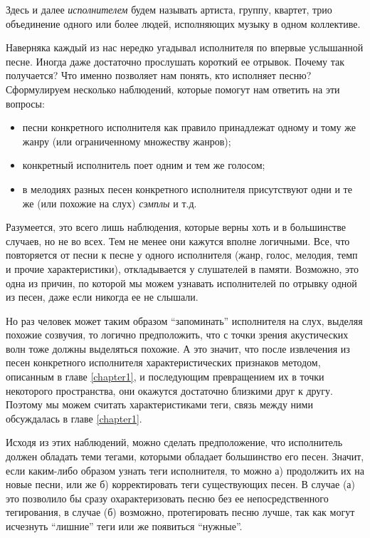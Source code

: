 Здесь и далее \emph{исполнителем} будем называть артиста, группу, квартет, трио \ld объединение одного или более людей, исполняющих музыку в одном коллективе.

Наверняка каждый из нас нередко угадывал исполнителя по впервые услышанной песне. Иногда даже достаточно прослушать короткий ее отрывок. Почему так получается? 
Что именно позволяет нам понять, кто исполняет песню? 
Сформулируем несколько наблюдений, которые помогут нам ответить на эти вопросы:
\begin{itemize}
 \item песни конкретного исполнителя как правило принадлежат одному и тому же жанру (или ограниченному множеству жанров);
 \item конкретный исполнитель поет одним и тем же голосом;
 \item в мелодиях разных песен конкретного исполнителя присутствуют одни и те же (или похожие на слух) \emph{сэмплы} и т.д.
\end{itemize}
Разумеется, это всего лишь наблюдения, которые верны хоть и в большинстве случаев, но не во всех. Тем не менее они кажутся вполне логичными.
Все, что повторяется от песни к песне у одного исполнителя (жанр, голос, мелодия, темп и прочие характеристики), откладывается у слушателей в памяти.
Возможно, это одна из причин, по которой мы можем узнавать исполнителей по отрывку одной из песен, даже если никогда ее не слышали.

Но раз человек может таким образом ``запоминать'' исполнителя на слух, выделяя похожие созвучия, то логично предположить, что с точки зрения акустических волн тоже должны выделяться похожие.
А это значит, что после извлечения из песен конкретного исполнителя  характеристических признаков методом, описанным в главе \ref{chapter1}, 
и последующим превращением их в точки некоторого пространства, они окажутся достаточно близкими друг к другу. 
Поэтому мы можем считать характеристиками теги, связь между ними обсуждалась в главе \ref{chapter1}.

Исходя из этих наблюдений, можно сделать предположение, что исполнитель должен обладать теми тегами, которыми обладает большинство его песен.
Значит, если каким-либо образом узнать теги исполнителя, то можно а) продолжить их на новые песни, или же б) корректировать теги существующих песен.
В случае (а) это позволило бы сразу охарактеризовать песню без ее непосредственного тегирования, в случае (б) \ld возможно, 
протегировать песню лучше, так как могут исчезнуть ``лишние'' теги или же появиться ``нужные''.

